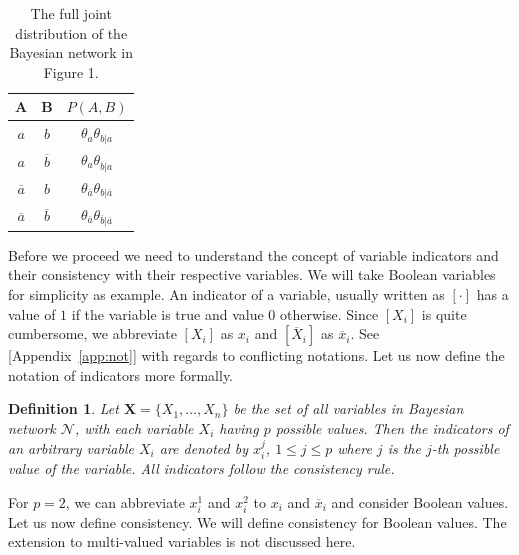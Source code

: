 \documentclass[a4paper,10pt]{article}
\theoremstyle{plain}
\newtheorem*{spn-def}{Definition}
\begin{document}
\begin{table}[h]
  \begin{center}
    \captionsetup{justification=centering}
    \begin{tabular}{c c | c}
      A & B & $P(A,B)$ \\
      \hline
      $a$ & $b$ & $\theta_a\theta_{b|a}$ \\
      $a$ & $\overline{b}$ & $\theta_a\theta_{\overline{b}|a}$ \\
      $\overline{a}$ & $b$ & $\theta_{\overline{a}}\theta_{b|\overline{a}}$ \\
      $\overline{a}$ & $\overline{b}$ & $\theta_{\overline{a}}\theta_{\overline{b}|\overline{a}}$\\
    \end{tabular}
    \caption{The full joint distribution of the Bayesian network in Figure 1.}
  \end{center}
\end{table}

Before we proceed we need to understand the concept of variable indicators and their consistency
with their respective variables. We will take Boolean variables for simplicity as example. An
indicator of a variable, usually written as $[\cdot]$ has a value of $1$ if the variable is true
and value $0$ otherwise. Since $[X_i]$ is quite cumbersome, we abbreviate $[X_i]$ as $x_i$
and $[\overline{X}_i]$ as $\overline{x}_i$. See [Appendix~\ref{app:not}] with regards to
conflicting notations. Let us now define the notation of indicators more formally.

\begin{spn-def}
  Let $\mathbf{X}=\{X_1,\ldots,X_n\}$ be the set of all variables in Bayesian network
  $\mathcal{N}$, with each variable $X_i$ having $p$ possible values. Then the indicators of
  an arbitrary variable $X_i$ are denoted by $x_i^j$, $1\leq j \leq p$ where $j$ is the $j$-th
  possible value of the variable. All indicators follow the consistency rule.
\end{spn-def}

For $p=2$, we can abbreviate $x_i^1$ and $x_i^2$ to $x_i$ and $\overline{x}_i$ and consider
Boolean values. Let us now define consistency. We will define consistency for Boolean values. The
extension to multi-valued variables is not discussed here.
\end{document}
